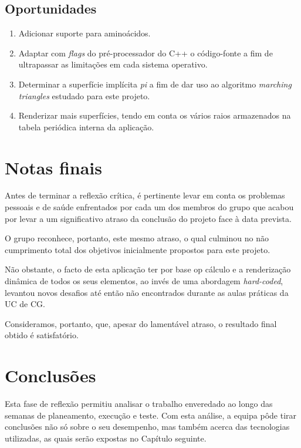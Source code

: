 \subsection{Oportunidades}
\label{ssec::reflexao:critica:oportunidades}

\begin{enumerate}[nosep]
	\item Adicionar suporte para aminoácidos.
    \item Adaptar com \textit{flags} do pré-processador do C++ o código-fonte a fim de ultrapassar as limitações em cada sistema operativo.
    \item Determinar a superfície implícita \textit{pi} a fim de dar uso ao algoritmo \textit{marching triangles} estudado para este projeto.
    \item Renderizar mais superfícies, tendo em conta os vários raios armazenados na tabela periódica interna da aplicação.
\end{enumerate}



\section{Notas finais}
\label{sec::reflexao:notas}

Antes de terminar a reflexão crítica, é pertinente levar em conta os problemas pessoais e de saúde enfrentados por cada um dos membros do grupo que acabou por levar a um significativo atraso da conclusão do projeto face à data prevista.

O grupo reconhece, portanto, este mesmo atraso, o qual culminou no não cumprimento total dos objetivos inicialmente propostos para este projeto.

Não obstante, o facto de esta aplicação ter por base op cálculo e a renderização dinâmica de todos os seus elementos, ao invés de uma abordagem \textit{hard-coded}, levantou novos desafios até então não encontrados durante as aulas práticas da \ac{UC} de \ac{CG}.

Consideramos, portanto, que, apesar do lamentável atraso, o resultado final obtido é satisfatório.


\section{Conclusões}
\label{sec::reflexao:conclusao}

Esta fase de reflexão permitiu analisar o trabalho enveredado ao longo das semanas de planeamento, execução e teste. Com esta análise, a equipa pôde tirar conclusões não só sobre o seu desempenho, mas também acerca das tecnologias utilizadas, as quais serão expostas no Capítulo seguinte.
